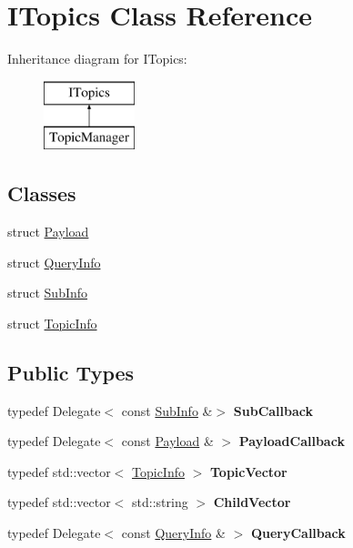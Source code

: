 \hypertarget{class_i_topics}{}\section{I\+Topics Class Reference}
\label{class_i_topics}
Inheritance diagram for I\+Topics\+:\begin{figure}[H]
\begin{center}
\leavevmode
\includegraphics[height=2.000000cm]{class_i_topics}
\end{center}
\end{figure}
\subsection*{Classes}
\begin{DoxyCompactItemize}
\item 
struct \hyperlink{struct_i_topics_1_1_payload}{Payload}
\item 
struct \hyperlink{struct_i_topics_1_1_query_info}{Query\+Info}
\item 
struct \hyperlink{struct_i_topics_1_1_sub_info}{Sub\+Info}
\item 
struct \hyperlink{struct_i_topics_1_1_topic_info}{Topic\+Info}
\end{DoxyCompactItemize}
\subsection*{Public Types}
\begin{DoxyCompactItemize}
\item 
\mbox{\label{class_i_topics_a74ad40307166ea0365736630872ba6e9}} 
typedef Delegate$<$ const \hyperlink{struct_i_topics_1_1_sub_info}{Sub\+Info} \&$>$ {\bfseries Sub\+Callback}
\item 
\mbox{\label{class_i_topics_ab6fa21c607acaeedc367364086ef1292}} 
typedef Delegate$<$ const \hyperlink{struct_i_topics_1_1_payload}{Payload} \& $>$ {\bfseries Payload\+Callback}
\item 
\mbox{\label{class_i_topics_a9afa8b499d4b423217ce644dfb378057}} 
typedef std\+::vector$<$ \hyperlink{struct_i_topics_1_1_topic_info}{Topic\+Info} $>$ {\bfseries Topic\+Vector}
\item 
\mbox{\label{class_i_topics_a8f90a85e794ed0c0309cab2ea053a9ce}} 
typedef std\+::vector$<$ std\+::string $>$ {\bfseries Child\+Vector}
\item 
\mbox{\label{class_i_topics_a35b7b6fadd6d1010e16f1f33fd1d1994}} 
typedef Delegate$<$ const \hyperlink{struct_i_topics_1_1_query_info}{Query\+Info} \& $>$ {\bfseries Query\+Callback}
\end{DoxyCompactItemize}
